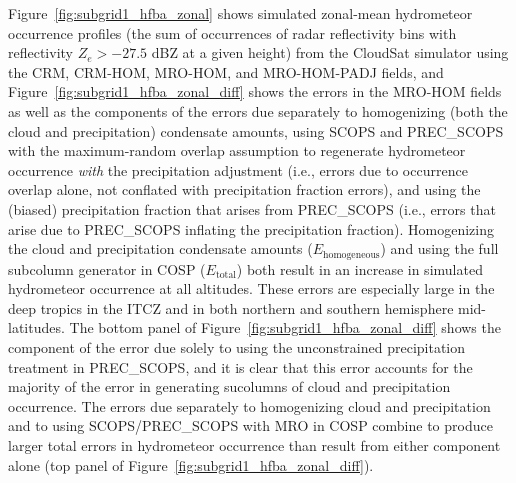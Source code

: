 Figure~\ref{fig:subgrid1_hfba_zonal} shows simulated zonal-mean
hydrometeor occurrence profiles (the sum of occurrences of radar
reflectivity bins with reflectivity \(Z_e > -27.5\) dBZ at a given
height) from the CloudSat simulator using the CRM, CRM-HOM, MRO-HOM, and
MRO-HOM-PADJ fields, and Figure~\ref{fig:subgrid1_hfba_zonal_diff} shows
the errors in the MRO-HOM fields as well as the components of the errors
due separately to homogenizing (both the cloud and precipitation)
condensate amounts, using SCOPS and PREC\_SCOPS with the maximum-random
overlap assumption to regenerate hydrometeor occurrence \emph{with} the
precipitation adjustment (i.e., errors due to occurrence overlap alone,
not conflated with precipitation fraction errors), and using the
(biased) precipitation fraction that arises from PREC\_SCOPS (i.e.,
errors that arise due to PREC\_SCOPS inflating the precipitation
fraction). Homogenizing the cloud and precipitation condensate amounts
(\(E_\textrm{homogeneous}\)) and using the full subcolumn generator in
COSP (\(E_\textrm{total}\)) both result in an increase in simulated
hydrometeor occurrence at all altitudes. These errors are especially
large in the deep tropics in the ITCZ and in both northern and southern
hemisphere mid-latitudes. The bottom panel of
Figure~\ref{fig:subgrid1_hfba_zonal_diff} shows the component of the
error due solely to using the unconstrained precipitation treatment in
PREC\_SCOPS, and it is clear that this error accounts for the majority
of the error in generating sucolumns of cloud and precipitation
occurrence. The errors due separately to homogenizing cloud and
precipitation and to using SCOPS/PREC\_SCOPS with MRO in COSP combine to
produce larger total errors in hydrometeor occurrence than result from
either component alone (top panel of
Figure~\ref{fig:subgrid1_hfba_zonal_diff}).

